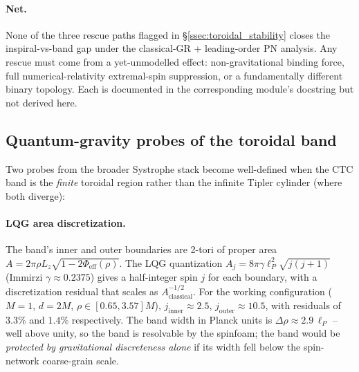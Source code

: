 \documentclass[11pt,a4paper]{article}
\begin{document}
\paragraph{Net.} None of the three rescue paths flagged in \S\ref{ssec:toroidal_stability} closes the inspiral-vs-band gap under the classical-GR + leading-order PN analysis. Any rescue must come from a yet-unmodelled effect: non-gravitational binding force, full numerical-relativity extremal-spin suppression, or a fundamentally different binary topology. Each is documented in the corresponding module's docstring but not derived here.

\subsection{Quantum-gravity probes of the toroidal band}\label{ssec:toroidal_quantum}

Two probes from the broader Systrophe stack become well-defined when the CTC band is the \emph{finite} toroidal region rather than the infinite Tipler cylinder (where both diverge):

\paragraph{LQG area discretization.} The band's inner and outer boundaries are 2-tori of proper area $A=2\pi\rho L_{z}\sqrt{1-2\Phi_{\mathrm{eff}}(\rho)}$. The LQG quantization $A_{j}=8\pi\gamma\ell_{P}^{2}\sqrt{j(j+1)}$ (Immirzi $\gamma\approx 0.2375$) gives a half-integer spin $j$ for each boundary, with a discretization residual that scales as $A_{\mathrm{classical}}^{-1/2}$. For the working configuration ($M=1$, $d=2M$, $\rho\in[0.65,3.57]M$), $j_{\mathrm{inner}}\!\approx\!2.5$, $j_{\mathrm{outer}}\!\approx\!10.5$, with residuals of $3.3\%$ and $1.4\%$ respectively. The band width in Planck units is $\Delta\rho\approx 2.9\,\ell_{P}$ -- well above unity, so the band is resolvable by the spinfoam; the band would be \emph{protected by gravitational discreteness alone} if its width fell below the spin-network coarse-grain scale.
\end{document}
